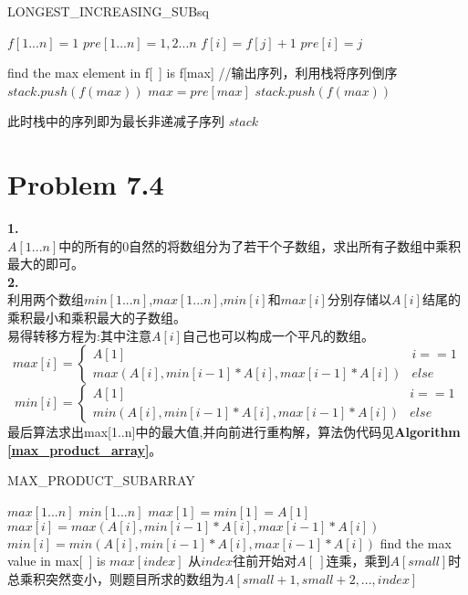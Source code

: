 \documentclass[onecolumn]{ctexart}
\begin{document}
\begin{algorithm}[htbp]
	\caption{LONGEST\_INCREASING\_SUBsq}
	\label{longest increasing}
	\begin{algorithmic}[1]
		\STATE $f[1...n]={1}$
		\STATE $pre[1...n]={1,2...n}$
					\STATE $f[i]=f[j]+1$
					\STATE $pre[i]=j$
				\ENDIF
			\ENDFOR
		\ENDFOR
		
		\STATE find the max element in f[\ ] is f[max]
		\STATE //输出序列，利用栈将序列倒序
		\STATE $stack.push(f(max))$
			\STATE $max=pre[max]$
			\STATE $stack.push(f(max))$
		\ENDWHILE
		
		\STATE 此时栈中的序列即为最长非递减子序列
		\RETURN $stack$		
	\end{algorithmic}
\end{algorithm}

\section*{Problem 7.4}
\noindent \textbf{1.}\\
\indent $A[1...n]$中的所有的0自然的将数组分为了若干个子数组，求出所有子数组中乘积最大的即可。\\

\noindent \textbf{2.}\\
\indent 利用两个数组$min[1...n]$,$max[1...n]$,$min[i]$和$max[i]$分别存储以$A[i]$结尾的乘积最小和乘积最大的子数组。\\
\indent 易得转移方程为:其中注意$A[i]$自己也可以构成一个平凡的数组。
\[
max[i]=
\begin{cases}
A[1] &i==1\\
max(A[i],min[i-1]*A[i],max[i-1]*A[i]) &else
\end{cases}
\]
\[
min[i]=
\begin{cases}
A[1] &i==1\\
min(A[i],min[i-1]*A[i],max[i-1]*A[i])&else
\end{cases}
\]
\indent 最后算法求出max[1..n]中的最大值,并向前进行重构解，算法伪代码见\textbf{Algorithm \ref{max_product_array}}。
\begin{algorithm}[htbp]
	\caption{MAX\_PRODUCT\_SUBARRAY}
	\label{max_product_array}
	\begin{algorithmic}[1]
		\STATE $max[1...n]$
		\STATE $min[1...n]$
		\STATE $max[1]=min[1]=A[1]$
			\STATE $max[i]=max(A[i],min[i-1]*A[i],max[i-1]*A[i])$
			\STATE $min[i]=min(A[i],min[i-1]*A[i],max[i-1]*A[i])$
		\ENDFOR
		\STATE find the max value in max[\ ] is $max[index]$
		\STATE 从$index$往前开始对$A[\ ]$连乘，乘到$A[small]$时总乘积突然变小，则题目所求的数组为$A[small+1,small+2,...,index]$
	\end{algorithmic}
\end{algorithm}
\end{document}
